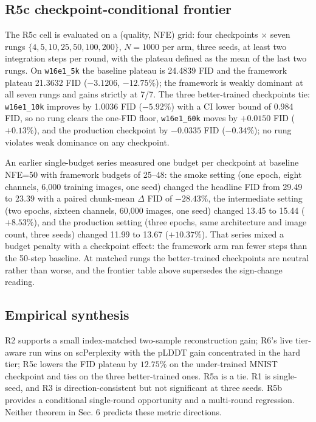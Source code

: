 \documentclass[journal,twocolumn,final]{IEEEtran}
\begin{document}
\subsection{R5c checkpoint-conditional frontier}
\label{sec:r5c-frontier}
The R5c cell is evaluated on a (quality, NFE) grid: four checkpoints $\times$ seven rungs $\{4,5,10,25,50,100,200\}$, $N=1000$ per arm, three seeds, at least two integration steps per round, with the plateau defined as the mean of the last two rungs. On \texttt{w16e1\_5k} the baseline plateau is 24.4839 FID and the framework plateau 21.3632 FID ($-3.1206$, $-12.75\%$); the framework is weakly dominant at all seven rungs and gains strictly at 7/7. The three better-trained checkpoints tie: \texttt{w16e1\_10k} improves by 1.0036 FID ($-5.92\%$) with a CI lower bound of 0.984 FID, so no rung clears the one-FID floor, \texttt{w16e1\_60k} moves by $+0.0150$ FID ($+0.13\%$), and the production checkpoint by $-0.0335$ FID ($-0.34\%$); no rung violates weak dominance on any checkpoint.

An earlier single-budget series measured one budget per checkpoint at baseline NFE=50 with framework budgets of 25--48: the smoke setting (one epoch, eight channels, 6,000 training images, one seed) changed the headline FID from 29.49 to 23.39 with a paired chunk-mean $\Delta$ FID of $-28.43\%$, the intermediate setting (two epochs, sixteen channels, 60,000 images, one seed) changed 13.45 to 15.44 ($+8.53\%$), and the production setting (three epochs, same architecture and image count, three seeds) changed 11.99 to 13.67 ($+10.37\%$). That series mixed a budget penalty with a checkpoint effect: the framework arm ran fewer steps than the 50-step baseline. At matched rungs the better-trained checkpoints are neutral rather than worse, and the frontier table above supersedes the sign-change reading.

\subsection{Empirical synthesis}
R2 supports a small index-matched two-sample reconstruction gain; R6's live tier-aware run wins on scPerplexity with the pLDDT gain concentrated in the hard tier; R5c lowers the FID plateau by $12.75\%$ on the under-trained MNIST checkpoint and ties on the three better-trained ones. R5a is a tie. R1 is single-seed, and R3 is direction-consistent but not significant at three seeds. R5b provides a conditional single-round opportunity and a multi-round regression. Neither theorem in Sec. 6 predicts these metric directions.
\end{document}

